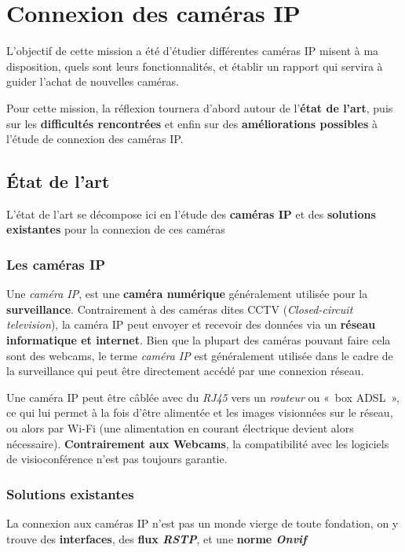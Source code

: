 \section{Connexion des caméras IP}

	L'objectif de cette mission a été d'étudier différentes caméras IP misent à ma disposition, quels sont leurs fonctionnalités, et établir un rapport qui servira à guider l'achat de nouvelles caméras.
    
    Pour cette mission, la réflexion tournera d'abord autour de l'\textbf{état de l'art}, puis sur les \textbf{difficultés rencontrées} et enfin sur des \textbf{améliorations possibles} à l'étude de connexion des caméras IP.

  \subsection{État de l'art}
  
  L’état de l'art se décompose ici en l'étude des \textbf{caméras IP} et des \textbf{solutions existantes} pour la connexion de ces caméras
 	 \subsubsection{Les caméras IP}
        Une \textit{caméra IP}, est une \textbf{caméra numérique} généralement utilisée pour la \textbf{surveillance}. Contrairement à des caméras dites CCTV (\textit{Closed-circuit television}), la caméra IP peut envoyer et recevoir des données via un \textbf{réseau informatique et internet}. Bien que la plupart des caméras pouvant faire cela sont des webcams, le terme \textit{caméra IP} est généralement utilisée 
dans le cadre de la surveillance qui peut être directement accédé par une connexion réseau.
        
        Une caméra IP peut être câblée avec du \textit{RJ45} vers un \textit{routeur} ou «~box ADSL~», ce qui lui permet à la fois d'être alimentée et les images visionnées sur le réseau, ou alors par Wi-Fi (une alimentation en courant électrique devient alors nécessaire). \textbf{Contrairement aux Webcams}, la compatibilité avec les logiciels de visioconférence n'est pas toujours garantie.
        
 	 \subsubsection{Solutions existantes}
     
     La connexion aux caméras IP n'est pas un monde vierge de toute fondation, on y trouve des \textbf{interfaces}, des \textbf{flux \textit{RSTP}}, et une \textbf{norme \textit{Onvif}}
     
